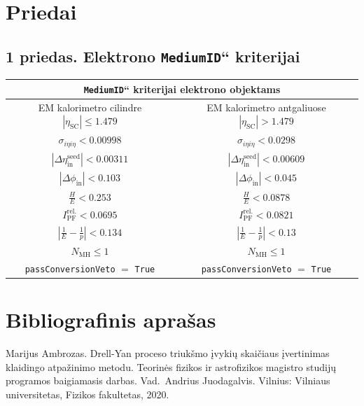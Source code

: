 \documentclass[a4paper, 12pt, oneside]{article}
\newcommand{\ttt}[1]{\texttt{#1}}
\newcommand{\ltq}[1]{{\quotedblbase{}#1\textquotedblleft{}}}
\newlength\q
\begin{document}
\newpage
\section*{Priedai} 

\subsection*{1 priedas. Elektrono \ltq{\ttt{MediumID}} kriterijai}

\begin{table}[H]
	\begin{tabular}{|c|c|}
		\hline
		\multicolumn{2}{|c|}{\ltq{\ttt{MediumID}} kriterijai elektrono objektams} \\
		\hline
		\multirow{2}{15em}{\centering EM kalorimetro cilindre $|\eta_{\mathrm{SC}}| \leqslant 1.479$} &
			\multirow{2}{15em}{\centering EM kalorimetro antgaliuose $|\eta_{\mathrm{SC}}| > 1.479$} \\
		 & \\
		\hline
		$\sigma_{i\eta i\eta}<0.00998$ & $\sigma_{i\eta i\eta}<0.0298$ \\
		$|\Delta\eta_{\mathrm{in}}^{\mathrm{seed}}|<0.00311$ & $|\Delta\eta_{\mathrm{in}}^{\mathrm{seed}}|<0.00609$ \\
		$|\Delta\phi_{\mathrm{in}}|<0.103$ & $|\Delta\phi_{\mathrm{in}}|<0.045$ \\
		\multirow{2}{15em}{\centering$\displaystyle\frac{H}{E}<0.253$} &
			\multirow{2}{15em}{\centering$\displaystyle\frac{H}{E}<0.0878$} \\
		 & \\
		$I_{\mathrm{PF}}^{\mathrm{rel.}}<0.0695$ & $I_{\mathrm{PF}}^{\mathrm{rel.}}<0.0821$ \\
		\multirow{2}{15em}{\centering$\displaystyle \left| \frac{1}{E} - \frac{1}{p} \right|<0.134$} &
			\multirow{2}{15em}{\centering$\displaystyle \left| \frac{1}{E} - \frac{1}{p} \right|<0.13$} \\
		 & \\
		$N_{\mathrm{MH}}\leqslant1$ & $N_{\mathrm{MH}}\leqslant1$ \\
		\ttt{passConversionVeto} $=$ \ttt{True} & \ttt{passConversionVeto} $=$ \ttt{True} \\
		\hline
	\end{tabular}
\end{table}


\newpage
\section*{Bibliografinis aprašas}
Marijus Ambrozas. Drell-Yan proceso triukšmo įvykių skaičiaus įvertinimas klaidingo atpažinimo metodu.
Teorinės fizikos ir astrofizikos magistro studijų programos baigiamasis darbas.
Vad.\ Andrius Juodagalvis. Vilnius: Vilniaus universitetas, Fizikos fakultetas, 2020.
\end{document}
